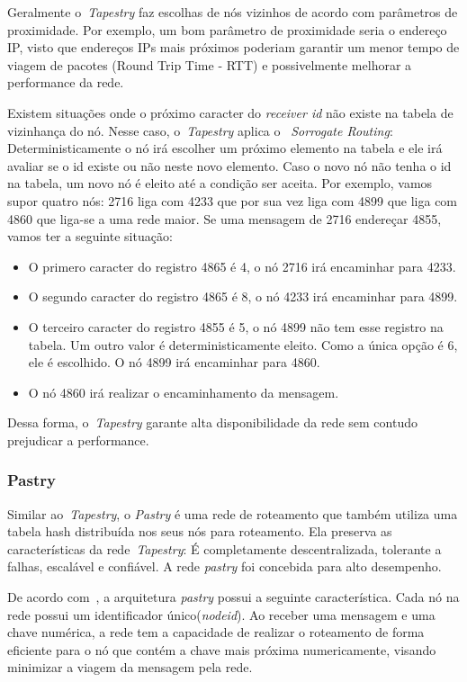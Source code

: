 Geralmente o~\emph{Tapestry} faz escolhas de nós vizinhos de acordo com parâmetros de proximidade. Por exemplo, um bom parâmetro de proximidade seria o endereço IP, visto que endereços IPs mais próximos poderiam garantir um menor tempo de viagem de pacotes (Round Trip Time - RTT) e possivelmente melhorar a performance da rede.

Existem situações onde o próximo caracter do \emph{receiver id} não existe na tabela de vizinhança do nó. Nesse caso, o~\emph{Tapestry} aplica o ~\emph{Sorrogate Routing}: Deterministicamente o nó irá escolher um próximo elemento na tabela e ele irá avaliar se o id existe ou não neste novo elemento. Caso o novo nó não tenha o id na tabela, um novo nó é eleito até a condição ser aceita. Por exemplo, vamos supor quatro nós: 2716 liga com 4233 que por sua vez liga com 4899 que liga com 4860 que liga-se a uma rede maior. Se uma mensagem de 2716 endereçar 4855, vamos ter a seguinte situação:
\begin{itemize}
	\item O primero caracter do registro 4865 é 4, o nó 2716 irá encaminhar para 4233.
	\item O segundo caracter do registro 4865 é 8, o nó 4233 irá encaminhar para 4899.
	\item O terceiro caracter do registro 4855 é 5, o nó 4899 não tem esse registro na tabela. Um outro valor é deterministicamente eleito. Como a única opção é 6, ele é escolhido. O nó 4899 irá encaminhar para 4860.
	\item O nó 4860 irá realizar o encaminhamento da mensagem.
\end{itemize}

Dessa forma, o~\emph{Tapestry} garante alta disponibilidade da rede sem contudo prejudicar a performance.

\subsubsection{Pastry}

Similar ao~\emph{Tapestry}, o \emph{Pastry} é uma rede de roteamento que também utiliza uma tabela hash distribuída nos seus nós para roteamento. Ela preserva as características da rede~\emph{Tapestry}: É completamente descentralizada, tolerante a falhas, escalável e confiável. A rede \emph{pastry} foi concebida para alto desempenho.

De acordo com~\cite{rowstron01}, a arquitetura \emph{pastry} possui a seguinte característica. Cada nó na rede possui um identificador único(\emph{nodeid}). Ao receber uma mensagem e uma chave numérica, a rede tem a capacidade de realizar o roteamento de forma eficiente para o nó que contém a chave mais próxima numericamente, visando minimizar a viagem da mensagem pela rede.

